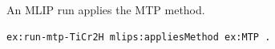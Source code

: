 An MLIP run applies the MTP method.
\begin{lstlisting}[language=turtle]
ex:run-mtp-TiCr2H mlips:appliesMethod ex:MTP .
\end{lstlisting}
